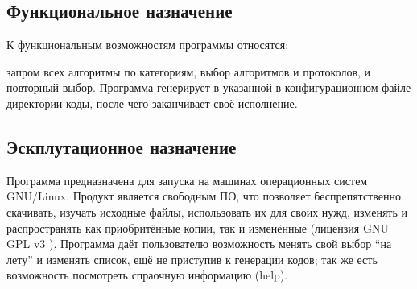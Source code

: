 \subsection{Функциональное назначение}
К функциональным возможностям программы относятся: 


запром всех алгоритмы по
категориям, выбор алгоритмов и протоколов, и повторный выбор. Программа
генерирует в указанной в конфигурационном файле директории коды, после чего
заканчивает своё исполнение.

\subsection{Эскплутационное назначение}
Программа предназначена для запуска на машинах операционных систем GNU/Linux.
Продукт является свободным ПО, что позволяет беспрепятственно скачивать,
изучать исходные файлы, использовать их для своих нужд, изменять и
распространять как приобритённые копии, так и изменённые (лицензия GNU GPL v3
\cite{gnu}).
Программа даёт пользователю возможность менять свой выбор ``на лету'' и
изменять список, ещё не приступив к генерации кодов; так же есть возможность
посмотреть спраочную информацию (help).


